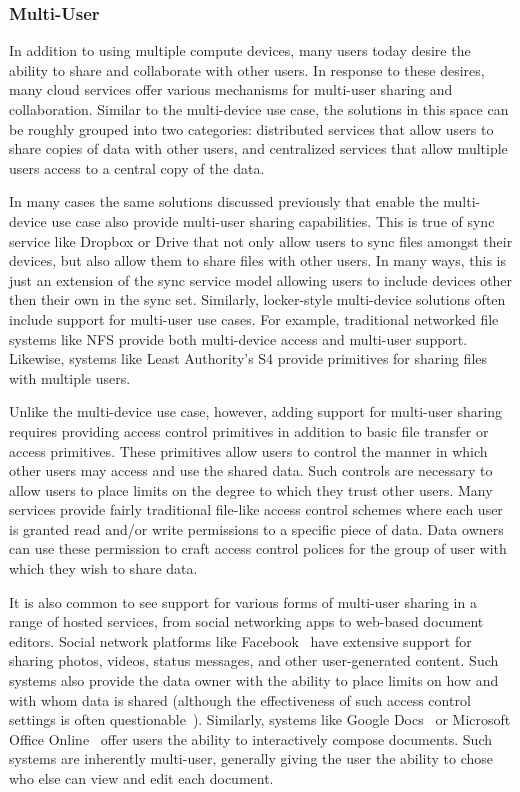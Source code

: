 \subsubsection{Multi-User}

In addition to using multiple compute devices, many users today desire
the ability to share and collaborate with other users. In response to
these desires, many cloud services offer various mechanisms for
multi-user sharing and collaboration. Similar to the multi-device use
case, the solutions in this space can be roughly grouped into two
categories: distributed services that allow users to share copies of
data with other users, and centralized services that allow multiple
users access to a central copy of the data.

In many cases the same solutions discussed previously that enable the
multi-device use case also provide multi-user sharing
capabilities. This is true of sync service like Dropbox or Drive that
not only allow users to sync files amongst their devices, but also
allow them to share files with other users. In many ways, this is just
an extension of the sync service model allowing users to include
devices other then their own in the sync set. Similarly, locker-style
multi-device solutions often include support for multi-user use
cases. For example, traditional networked file systems like NFS
provide both multi-device access and multi-user support. Likewise,
systems like Least Authority's S4 provide primitives for sharing files
with multiple users.

Unlike the multi-device use case, however, adding support for
multi-user sharing requires providing access control primitives in
addition to basic file transfer or access primitives. These primitives
allow users to control the manner in which other users may access and
use the shared data. Such controls are necessary to allow users to
place limits on the degree to which they trust other users. Many
services provide fairly traditional file-like access control schemes
where each user is granted read and/or write permissions to a specific
piece of data. Data owners can use these permission to craft access
control polices for the group of user with which they wish to share
data.

It is also common to see support for various forms of multi-user
sharing in a range of hosted services, from social networking apps to
web-based document editors. Social network platforms like
Facebook~\cite{facebook} have extensive support for sharing photos,
videos, status messages, and other user-generated content. Such
systems also provide the data owner with the ability to place limits
on how and with whom data is shared (although the effectiveness of
such access control settings is often
questionable~\cite{johnson2012}). Similarly, systems like Google
Docs~\cite{google-docs} or Microsoft Office
Online~\cite{microsoft-officeonline} offer users the ability to
interactively compose documents. Such systems are inherently
multi-user, generally giving the user the ability to chose who else
can view and edit each document.

